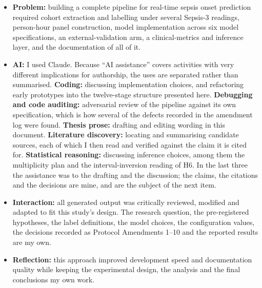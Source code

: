 \begin{itemize}
    \item \textbf{Problem:} building a complete pipeline for real-time sepsis
    onset prediction required cohort extraction and labelling under several
    Sepsis-3 readings, person-hour panel construction, model implementation
    across six model specifications, an external-validation arm, a clinical-metrics
    and inference layer, and the documentation of all of it.

    \item \textbf{AI:} I used Claude. Because ``AI assistance'' covers
    activities with very different implications for authorship, the uses are
    separated rather than summarised. \textbf{Coding:} discussing
    implementation choices, and refactoring early prototypes into the
    twelve-stage structure presented here. \textbf{Debugging and code
    auditing:} adversarial review of the pipeline against its own
    specification, which is how several of the defects recorded in the
    amendment log were found. \textbf{Thesis prose:} drafting and editing
    wording in this document. \textbf{Literature discovery:} locating and
    summarising candidate sources, each of which I then read and verified
    against the claim it is cited for. \textbf{Statistical reasoning:}
    discussing inference choices, among them the multiplicity plan and the
    interval-inversion reading of H6. In the last three the assistance was to
    the drafting and the discussion; the claims, the citations and the
    decisions are mine, and are the subject of the next item.

    \item \textbf{Interaction:} all generated output was critically reviewed,
    modified and adapted to fit this study's design. The research question, the
    pre-registered hypotheses, the label definitions, the model choices, the
    configuration values, the decisions recorded as Protocol Amendments 1--10
    and the reported results are my own.

    \item \textbf{Reflection:} this approach improved development speed and
    documentation quality while keeping the experimental design, the analysis
    and the final conclusions my own work.
\end{itemize}


